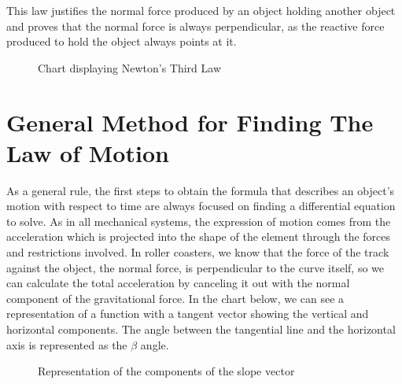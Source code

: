 \documentclass[12pt,twoside,a4paper]{article}
\begin{document}
	This law justifies the normal force produced by an object holding another object and proves that the normal force is always perpendicular, as the reactive force produced to hold the object always points at it.
	
	\begin{figure}[H]
		\centering
		\caption{Chart displaying Newton's Third Law}
		\label{fig:Newton's Third Law}
	\end{figure}
	
	\newpage
	
	\section{General Method for Finding The Law of Motion}
	As a general rule, the first steps to obtain the formula that describes an object's motion with respect to time are always focused on finding a differential equation to solve. As in all mechanical systems, the expression of motion comes from the acceleration which is projected into the shape of the element through the forces and restrictions involved. In roller coasters, we know that the force of the track against the object, the normal force, is perpendicular to the curve itself, so we can calculate the total acceleration by canceling it out with the normal component of the gravitational force. In the chart below, we can see a representation of a function with a tangent vector showing the vertical and horizontal components. The angle between the tangential line and the horizontal axis is represented as the $\beta$ angle.
	
	\begin{figure}[H]
		\centering
		\caption{Representation of the components of the slope vector}
		\label{graph:Force Projection Explanation}
	\end{figure}
	
\end{document}
